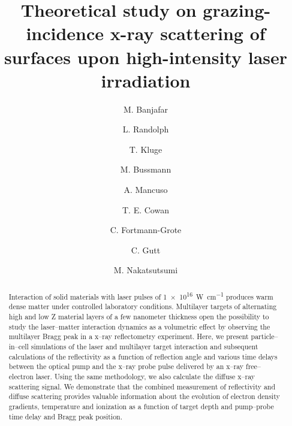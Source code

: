 \documentclass[preprint, 12pt]{elsarticle}
\begin{document}
\begin{frontmatter}



\title{Theoretical study on grazing-incidence x-ray scattering of  surfaces upon high-intensity laser irradiation}





\author[1]{M. Banjafar}
\author[2]{L. Randolph}
\author[3]{T. Kluge}
\author[3]{M. Bussmann}
\author[1]{A. Mancuso}
\author[3]{T. E. Cowan}
\author[1]{C. Fortmann-Grote}
\author[2]{C. Gutt}
\author[1]{M. Nakatsutsumi}


\address[1]{European XFEL GmbH, Holzkopple 4, 22869 Schenefeld, Germany}
\address[2]{Department of Physics, University of Siegen, D-57072 Siegen, Germany}
\address[3]{Helmholtz-Zentrum Dresden-Rossendorf, Bautzner Landstraße 400, 01328 Dresden, Germany}

\begin{abstract}
  Interaction of solid materials with laser pulses of \SI{1e16}{\watt\per\cm}
  produces warm dense matter under controlled laboratory conditions.
  Multilayer targets of alternating high and low Z material layers of a few
  nanometer thickness open the possibility
  to study the laser--matter interaction dynamics as a volumetric effect by
  observing the multilayer Bragg peak in a x--ray reflectometry experiment.
  Here, we present particle--in--cell simulations of
  the laser and multilayer target interaction and subsequent calculations of
  the reflectivity as a
  function of reflection angle and various time delays between the optical pump
  and the x--ray probe pulse delivered by an x--ray free--electron laser.
  Using the same methodology, we also calculate the diffuse x--ray scattering
  signal.
  We demonstrate that the combined measurement of reflectivity and
  diffuse scattering provides valuable information about the evolution of
  electron density gradients, temperature and ionization as a function of target
  depth and pump--probe time delay and Bragg peak position.
\end{abstract}


\end{frontmatter}
\end{document}

